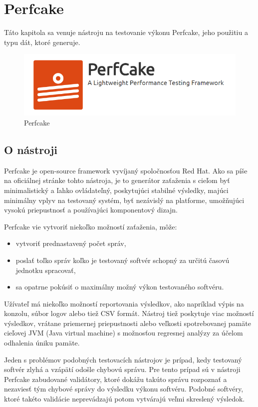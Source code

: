 \chapter{Perfcake}
\setcounter{page}{1}

Táto kapitola sa venuje nástroju na testovanie výkonu Perfcake, jeho použitiu a typu dát, ktoré generuje. 

\begin{figure}[ht]
\includegraphics[scale=1]{blog-logo.png}
\caption{Perfcake}
\end{figure} 

\section{O nástroji}

Perfcake je open-source framework vyvíjaný spoločnosťou Red Hat. Ako sa píše na oficiálnej stránke tohto nástroja, je to generátor zaťaženia s cieľom byť minimalistický a ľahko ovládateľný, poskytujúci stabilné výsledky, majúci minimálny vplyv na testovaný systém, byť nezávislý na platforme, umožňujúci vysokú priepustnosť a používajúci komponentový dizajn.

Perfcake vie vytvoriť niekoľko možností zaťaženia, môže:
\begin{itemize}  
\item vytvoriť prednastavený počet správ,
\item poslať toľko správ koľko je testovaný softvér schopný za určitú časovú jednotku spracovať,
\item sa opatrne pokúsiť o maximálny možný výkon testovaného softvéru.
\end{itemize}

Užívateľ má niekoľko možností reportovania výsledkov, ako napríklad výpis na konzolu, súbor logov alebo tiež CSV formát. Nástroj tiež poskytuje viac možností výsledkov, vrátane priemernej priepustnosti alebo veľkosti spotrebovanej pamäte cieľovej JVM (Java virtual machine) s možnosťou regresnej analýzy za účelom odhalenia úniku pamäte.

Jeden s problémov podobných testovacích nástrojov je prípad, kedy testovaný softvér zlyhá a vzápätí odošle chybovú správu. Pre tento prípad sú v nástroji Perfcake zabudované validátory, ktoré dokážu takúto správu rozpoznať a nezaviesť tým chybové správy do výsledku výkonu softvéru. Podobné softvéry, ktoré takéto validácie neprevádzajú potom vytvárajú veľmi skreslený výsledok.


